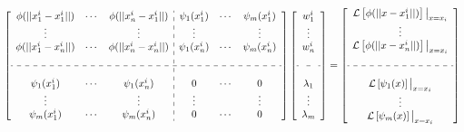 \documentclass[10pt,a4paper]{article}
\begin{document}
\begin{equation}\label{eq:RBFFDWeights}
\left[
      \begin{array}{ccc:ccc}
      \phi(||x^i_1 - x^i_1||) & \cdots & \phi(||x^i_n - x^i_1||) & \psi_1(x^i_1) & \cdots & \psi_m(x^i_1) \\
      \vdots                  &        & \vdots                  & \vdots        &        & \vdots        \\   
      \phi(||x^i_1 - x^i_n||) & \cdots & \phi(||x^i_n - x^i_n||) & \psi_1(x^i_n) & \cdots & \psi_m(x^i_n) \\  
                              &        &                         &               &        &               \\ \hdashline 
                              &        &                         &               &        &               \\
      \psi_1(x^i_1)           & \cdots & \psi_1(x^i_n)           &  0            & \cdots & 0             \\
      \vdots                  &        & \vdots                  &  \vdots       &        & \vdots        \\   
      \psi_m(x^i_1)           & \cdots & \psi_m(x^i_n)           &  0            & \cdots & 0             \\       
      \end{array}
\right]
\left[
  \begin{array}{c}
  w^i_1  \\
  \vdots \\
  w^i_n  \\
         \\ \hdashline
         \\
  \lambda_1 \\
  \vdots    \\
  \lambda_m \\
  \end{array}
\right]  
=
\left[
  \begin{array}{c}
  \mathcal{L}\left[ \phi(||x - x^i_1||) \right] \big|_{x=x_i} \\
  \vdots                                                      \\
  \mathcal{L}\left[ \phi(||x - x^i_n||) \right] \big|_{x=x_i} \\
                                                              \\ \hdashline
                                                              \\  
  \mathcal{L}\left[ \psi_1(x) \right] \big|_{x=x_i}           \\
  \vdots                                                      \\
  \mathcal{L}\left[ \psi_m(x) \right] \big|_{x=x_i}           \\
  \end{array}
\right]
\end{equation}
\end{document}

